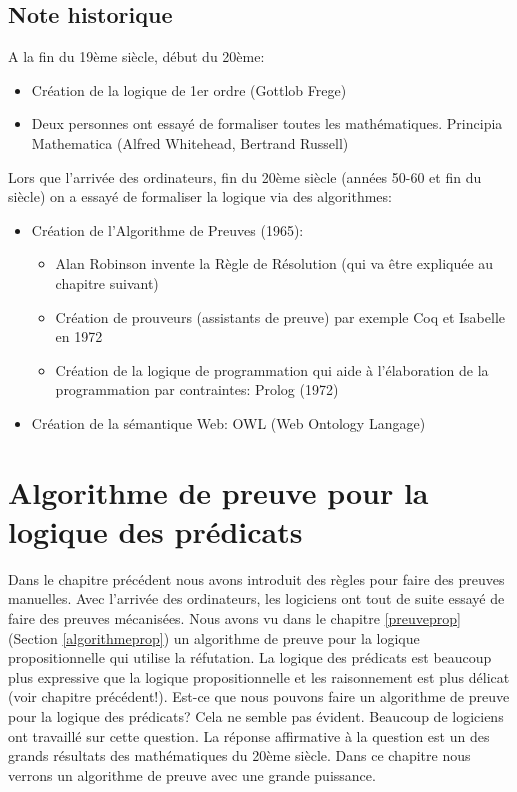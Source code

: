 \section{Note historique}

\hfill {\begin{minipage}{0.90\textwidth}
\begin{small}
A la fin du 19ème siècle, début du 20ème: 
\begin{itemize}
\item Création de la logique de 1er ordre (Gottlob Frege)
\item Deux personnes ont essayé de formaliser toutes les mathématiques. Principia Mathematica (Alfred Whitehead, Bertrand Russell)
\end{itemize}
Lors que l'arrivée des ordinateurs, fin du 20ème siècle (années 50-60 et fin du siècle) on a essayé de formaliser la logique via des algorithmes:
\begin{itemize}
\item Création de l'Algorithme de Preuves (1965):
\begin{itemize}
\item Alan Robinson invente la Règle de Résolution (qui va être expliquée au chapitre suivant)
\item Création de prouveurs (assistants de preuve) par exemple Coq et Isabelle en 1972
\item Création de la logique de programmation qui aide à l'élaboration de la programmation par contraintes: Prolog (1972) 
\end{itemize}
\item Création de la sémantique Web: OWL (Web Ontology Langage)
\end{itemize}
\end{small}
\end{minipage}

\chapter{Algorithme de preuve pour la logique des prédicats}
\label{algorithmepreuve}

Dans le chapitre précédent nous avons introduit des règles pour faire des preuves manuelles.
Avec l'arrivée des ordinateurs, les logiciens ont tout de suite essayé de faire des preuves mécanisées.
Nous avons vu dans le chapitre \ref{preuveprop} (Section \ref{algorithmeprop})
un algorithme de preuve pour la logique propositionnelle qui utilise la réfutation.
La logique des prédicats est beaucoup plus expressive que la logique propositionnelle
et les raisonnement est plus délicat (voir chapitre précédent!).
Est-ce que nous pouvons faire un algorithme de preuve pour la logique des prédicats?
Cela ne semble pas évident.
Beaucoup de logiciens ont travaillé sur cette question.
La réponse affirmative à la question est un des grands résultats des mathématiques du 20ème siècle.
Dans ce chapitre nous verrons un algorithme de preuve avec une grande puissance.

}
